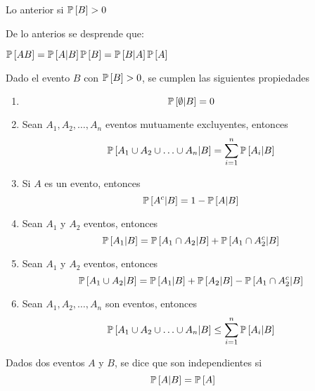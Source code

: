 Lo anterior si $\mathbb{P}\left[B\right]>0$

De lo anterios se desprende que:

$\mathbb{P}\left[AB\right]=\mathbb{P}\left[A|B\right]\mathbb{P}\left[B\right]=\mathbb{P}\left[B|A\right]\mathbb{P}\left[A\right]$


\begin{Propty} Dado el evento $B$ con $\mathbb{P}\left[B\right]>0$, se cumplen las siguientes propiedades
\begin{enumerate}
\item \begin{equation}\mathbb{P}\left[\emptyset|B\right]=0\end{equation}
\item Sean $A_{1},A_{2},\ldots,A_{n}$ eventos mutuamente excluyentes, entonces
\begin{equation}
\mathbb{P}\left[A_{1}\cup A_{2}\cup \ldots\cup A_{n}|B\right]=\sum_{i=1}^{n}\mathbb{P}\left[A_{i}|B\right]
\end{equation}
\item Si $A$ es un evento, entonces
\begin{equation}
\mathbb{P}\left[A^{c}|B\right]=1-\mathbb{P}\left[A|B\right]
\end{equation}
\item Sean $A_{1}$ y $A_{2}$ eventos, entonces
\begin{equation}
\mathbb{P}\left[A_{1}|B\right]=\mathbb{P}\left[A_{1}\cap A_{2}|B\right]+\mathbb{P}\left[A_{1}\cap A_{2}^{c}|B\right]
\end{equation}
\item Sean $A_{1}$ y $A_{2}$ eventos, entonces
\begin{equation}
\mathbb{P}\left[A_{1}\cup A_{2}|B\right]=\mathbb{P}\left[A_{1}|B\right]+\mathbb{P}\left[A_{2}|B\right]-\mathbb{P}\left[A_{1}\cap A_{2}^{c}|B\right]
\end{equation}
\item Sean $A_{1},A_{2},\ldots,A_{n}$ son eventos, entonces
\begin{equation}
\mathbb{P}\left[A_{1}\cup A_{2}\cup \ldots\cup A_{n}|B\right]\leq\sum_{i=1}^{n}\mathbb{P}\left[A_{i}|B\right]
\end{equation}
\end{enumerate}
\end{Propty}


\begin{Def}
Dados dos eventos $A$ y $B$, se dice que son independientes si 
\begin{equation}
\mathbb{P}\left[A|B\right]=\mathbb{P}\left[A\right]
\end{equation}
\end{Def}


